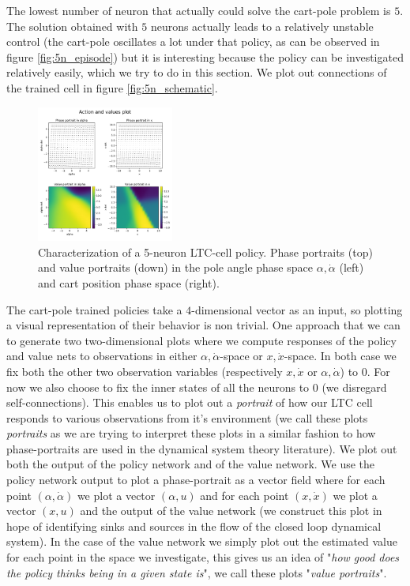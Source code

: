 The lowest number of neuron that actually could solve the cart-pole problem is $5$. The solution obtained with $5$ neurons actually leads to a relatively unstable control (the cart-pole oscillates a lot under that policy, as can be observed in figure \ref{fig:5n_episode}) but it is interesting because the policy can be investigated relatively easily, which we try to do in this section.  We plot out connections of the trained cell in figure \ref{fig:5n_schematic}.\\

\begin{figure}[h!]
    \centering
    \includegraphics[width=0.4\textwidth]{figures/5n_portrait.pdf}
    \caption{Characterization of a 5-neuron LTC-cell policy. Phase portraits (top) and value portraits (down) in the pole angle phase space $\alpha,\dot{\alpha}$ (left) and cart position phase space (right).}
    \label{fig:5n_portrait}
\end{figure}

The cart-pole trained policies take a $4$-dimensional vector as an input, so plotting a visual representation of their behavior is non trivial. One approach that we can to generate two two-dimensional plots where we compute responses of the policy and value nets to observations in either $\alpha,\dot{\alpha}$-space or $x,\dot{x}$-space. 
In both case we fix both the other two observation variables (respectively $x,\dot{x}$ or $\alpha,\dot{\alpha}$) to $0$. For now we also choose to fix the inner states of all the neurons to $0$ (we disregard self-connections). 
This enables us to plot out a \textit{portrait} of how our LTC cell responds to various observations from it's environment (we call these plots \textit{portraits} as we are trying to interpret these plots in a similar fashion to how phase-portraits are used in the dynamical system theory literature). We plot out both the output of the policy network and of the value network. We use the policy network output to plot a phase-portrait as a vector field where for each point $(\alpha,\dot{\alpha})$ we plot a vector $(\alpha,u)$ and for each point $(x,\dot{x})$ we plot a vector $(x,u)$ and the output of the value network (we construct this plot in hope of identifying sinks and sources in the flow of the closed loop dynamical system). In the case of the value network we simply plot out the estimated value for each point in the space we investigate, this gives us an idea of "\textit{how good does the policy thinks being in a given state is}", we call these plots "\textit{value portraits}". \\



